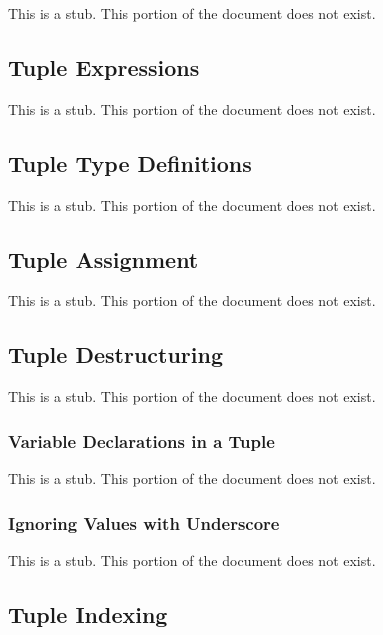 \label{Tuples}

This is a stub.  This portion of the document does not exist.

\subsection{Tuple Expressions}
\label{Tuple_Expressions}

This is a stub.  This portion of the document does not exist.

\subsection{Tuple Type Definitions}
\label{Tuple_Type_Definitions}

This is a stub.  This portion of the document does not exist.

\subsection{Tuple Assignment}
\label{Tuple_Assignment}

This is a stub.  This portion of the document does not exist.

\subsection{Tuple Destructuring}
\label{Tuple_Destructuring}

This is a stub.  This portion of the document does not exist.

\subsubsection{Variable Declarations in a Tuple}
\label{Variable_Declarations_in_a_Tuple}

This is a stub.  This portion of the document does not exist.

\subsubsection{Ignoring Values with Underscore}
\label{Ignoring_Values_with_Underscore}

This is a stub.  This portion of the document does not exist.

\subsection{Tuple Indexing}
\label{Tuple_Indexing}

